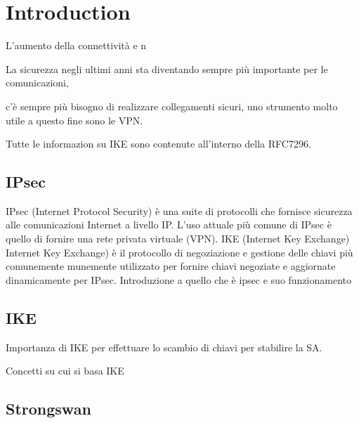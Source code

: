 \documentclass[
10pt, %
a4paper, %
oneside, %
headinclude,footinclude, %
BCOR5mm, %
]{scrartcl}
\begin{document}

\newpage %


\section{Introduction}

L'aumento della connettività e n

La sicurezza negli ultimi anni sta diventando sempre più importante per le comunicazioni, 

c'è sempre più bisogno di realizzare collegamenti sicuri, uno strumento molto utile a questo fine sono le VPN.

Tutte le informazion su IKE sono contenute all'interno della RFC7296\cite{rfc7296}.

\subsection{IPsec}

IPsec (Internet Protocol Security) è una suite di protocolli che fornisce sicurezza alle comunicazioni Internet a livello IP. L'uso attuale più comune di IPsec è quello di fornire una rete privata virtuale (VPN).  IKE (Internet Key Exchange)
   Internet Key Exchange) è il protocollo di negoziazione e gestione delle chiavi più comunemente munemente utilizzato per fornire chiavi negoziate e aggiornate dinamicamente per IPsec.
Introduzione a quello che è ipsec e suo funzionamento

\subsection{IKE}


Importanza di IKE per effettuare lo scambio di chiavi per stabilire la SA.

Concetti su cui si basa IKE

\subsection{Strongswan}
\end{document}
